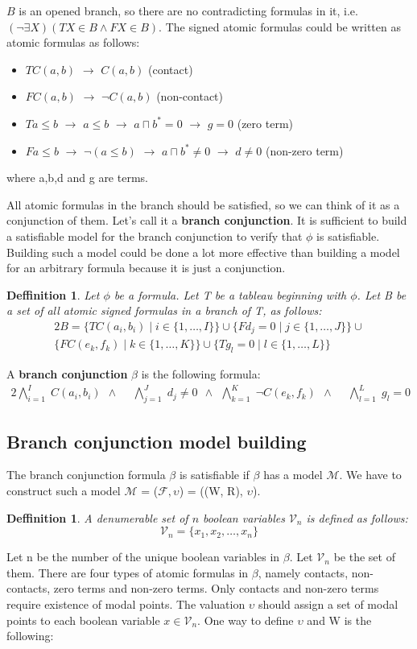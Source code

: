 \documentclass{article}
\newcommand\M{\mathcal{M}}
\newcommand\F{\mathcal{F}}
\newcommand\V{\mathcal{V}}
\newtheorem{defn}[theorem]{Deffinition}
\newcommand{\BranchConjunction}{%
\begin{alignat}{2}
			\bigwedge_{i=1}^{I} \; C(a_i, b_i) \:\: \wedge \:\: &
			\bigwedge_{j=1}^{J} \; d_j \neq 0 \:\: \wedge \:\:
			\bigwedge_{k=1}^{K} \; \neg C(e_k, f_k) \:\: \wedge \:\: &
			\bigwedge_{l=1}^{L} \; g_l = 0 \:\:
\end{alignat}%
}
\begin{document}
		\noindent $B$ is an opened branch, so there are no contradicting formulas in it, i.e. $(\neg \exists X)(T X \in B \land F X \in B)$.
		The signed atomic formulas could be written as atomic formulas as follows:
		\begin{itemize}
			\item $T C(a,b)$ $\rightarrow$ $C(a,b)$ (contact)
			\item $F C(a,b)$ $\rightarrow$ $\neg C(a,b)$ (non-contact)
			\item $T a \leq b$ $\rightarrow$ $a \leq b$ $\rightarrow$ $a \sqcap b^*=0$ $\rightarrow$ $g = 0$ (zero term)
			\item $F a \leq b$ $\rightarrow$ $\neg (a \leq b)$ $\rightarrow$ $a \sqcap b^* \neq 0$ $\rightarrow$ $d \neq 0$ (non-zero term)
		\end{itemize}
			\noindent where a,b,d and g are terms.

		All atomic formulas in the branch should be satisfied, so we can think of it as a conjunction of them. Let's call it a \textbf{branch conjunction}. It is sufficient to build a satisfiable model for the branch conjunction to verify that $\phi$ is satisfiable. Building  such a model could be done a lot more effective than building a model for an arbitrary formula because it is just a conjunction.
		\begin{defn}
			\label{branch-conjunction}
			Let $\phi$ be a formula. Let T be a tableau beginning with $\phi$. Let B be a set of all atomic signed formulas in a branch of T, as follows:
			\begin{alignat}{2}
				B = \{T C(a_i, b_i) \mid i \in \{1, \ldots, I\} \} \cup
					\{F d_j = 0 \mid j \in \{1, \ldots, J\} \} \cup \\\nonumber
					\{F C(e_k, f_k) \mid k \in \{1, \ldots, K\} \} \cup
					\{T g_l = 0 \mid l \in \{1, \ldots, L\} \}
			\end{alignat}
		\end{defn}
		A \textbf{branch conjunction} $\beta$ is the following formula:
		 \BranchConjunction

	\subsection{Branch conjunction model building}
		The branch conjunction formula $\beta$ is satisfiable if $\beta$ has a model $\M$. We have to construct such a model $\M$ = ($\F, \upsilon$) = ((W, R), $\upsilon$). 
		\begin{defn}
			A denumerable set of $n$ boolean variables $\V_n$ is defined as follows:
			\begin{equation}
				\label{boolean-evaluation}
				\V_n = \{x_1, x_2, \ldots , x_n \}
			\end{equation}
		\end{defn}
		Let n be the number of the unique boolean variables in $\beta$. Let $\V_n$ be the set of them. There are four types of atomic formulas in $\beta$, namely contacts, non-contacts, zero terms and non-zero terms. Only contacts and non-zero terms require existence of modal points. The valuation $\upsilon$ should assign a set of modal points to each boolean variable $x \in \V_n$. One way to define $\upsilon$ and W is the following:
		
\end{document}
